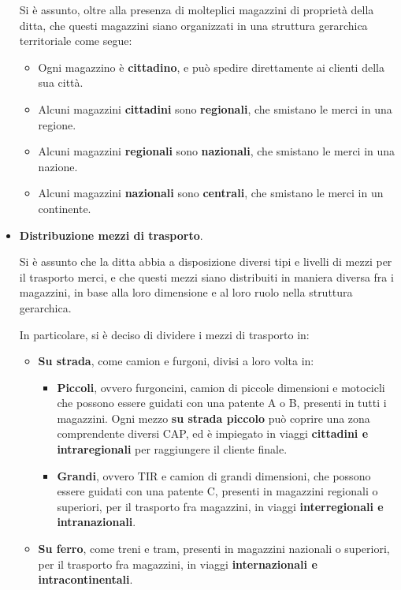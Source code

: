 \begin{itemize}
  Si è assunto, oltre alla presenza di molteplici magazzini di proprietà della ditta, che questi magazzini siano organizzati in una struttura gerarchica territoriale come segue:
  \begin{itemize}
    \item Ogni magazzino è \textbf{cittadino}, e può spedire direttamente ai clienti della sua città.
    \item Alcuni magazzini \textbf{cittadini} sono \textbf{regionali}, che smistano le merci in una regione.
    \item Alcuni magazzini \textbf{regionali} sono \textbf{nazionali}, che smistano le merci in una nazione.
    \item Alcuni magazzini \textbf{nazionali} sono \textbf{centrali}, che smistano le merci in un continente.
    \end{itemize}

  \item \textbf{Distribuzione mezzi di trasporto}.
  
  Si è assunto che la ditta abbia a disposizione diversi tipi e livelli di mezzi per il trasporto merci, e che questi mezzi siano distribuiti in maniera diversa fra i magazzini, in base alla loro dimensione e al loro ruolo nella struttura gerarchica.

  In particolare, si è deciso di dividere i mezzi di trasporto in:
  
  \begin{itemize}
    \item \textbf{Su strada}, come camion e furgoni, divisi a loro volta in:
      \begin{itemize}
        \item \textbf{Piccoli}, ovvero furgoncini, camion di piccole dimensioni e motocicli che possono essere guidati con una patente A o B, presenti in tutti i magazzini. Ogni mezzo \textbf{su strada piccolo} può coprire una zona comprendente diversi CAP, ed è impiegato in viaggi \textbf{cittadini e intraregionali} per raggiungere il cliente finale.
        \item \textbf{Grandi}, ovvero TIR e camion di grandi dimensioni, che possono essere guidati con una patente C, presenti in magazzini regionali o superiori, per il trasporto fra magazzini, in viaggi \textbf{interregionali e intranazionali}.
      \end{itemize}
    
    \item \textbf{Su ferro}, come treni e tram, presenti in magazzini nazionali o superiori, per il trasporto fra magazzini, in viaggi \textbf{internazionali e intracontinentali}.
    

\end{itemize}
\end{itemize}

